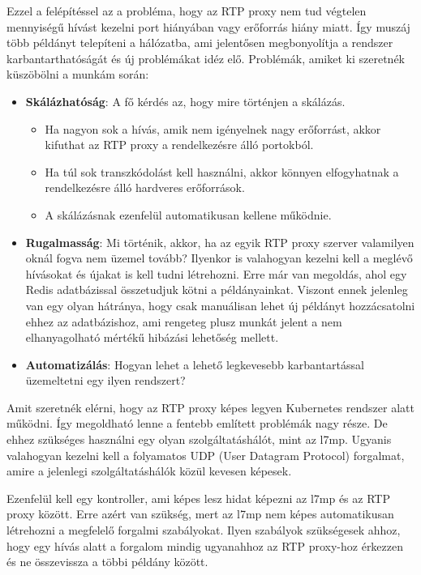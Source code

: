 Ezzel a felépítéssel az a probléma, hogy az RTP proxy nem tud végtelen mennyiségű
hívást kezelni port hiányában vagy erőforrás hiány miatt. Így muszáj több példányt
telepíteni a hálózatba, ami jelentősen megbonyolítja a rendszer 
karbantarthatóságát és új problémákat idéz elő. Problémák, amiket ki szeretnék 
küszöbölni a munkám során:

\begin{itemize}
	\item \textbf{Skálázhatóság}: A fő kérdés az, hogy mire történjen a skálázás. 
	\begin{itemize}
		\item Ha nagyon sok a hívás, amik nem igényelnek nagy erőforrást, akkor
		kifuthat az RTP proxy a rendelkezésre álló portokból.
		\item Ha túl sok transzkódolást kell használni, akkor könnyen elfogyhatnak
		a rendelkezésre álló hardveres erőforrások.
		\item A skálázásnak ezenfelül automatikusan kellene működnie. 
	\end{itemize}
	\item \textbf{Rugalmasság}: Mi történik, akkor, ha az egyik RTP proxy szerver
	valamilyen oknál fogva nem üzemel tovább? Ilyenkor is valahogyan kezelni 
	kell a meglévő hívásokat és újakat is kell tudni létrehozni. Erre már van 
	megoldás, ahol egy Redis adatbázissal összetudjuk kötni a példányainkat. 
	Viszont ennek jelenleg van egy olyan hátránya, hogy csak manuálisan lehet 
	új példányt hozzácsatolni ehhez az adatbázishoz, ami rengeteg plusz munkát 
	jelent a nem elhanyagolható mértékű hibázási lehetőség mellett.
	\item \textbf{Automatizálás}: Hogyan lehet a lehető legkevesebb 
	karbantartással üzemeltetni egy ilyen rendszert? 
\end{itemize}

Amit szeretnék elérni, hogy az RTP proxy képes legyen Kubernetes rendszer alatt 
működni. Így megoldható lenne a fentebb említett problémák nagy része. De 
ehhez szükséges használni egy olyan szolgáltatáshálót, mint az l7mp. Ugyanis 
valahogyan kezelni kell a folyamatos UDP (User Datagram Protocol) forgalmat, amire
a jelenlegi szolgáltatáshálók közül kevesen képesek.

Ezenfelül kell egy kontroller, ami képes lesz hidat képezni az l7mp és az RTP 
proxy között. Erre azért van szükség, mert az l7mp nem képes automatikusan 
létrehozni a megfelelő forgalmi szabályokat. Ilyen szabályok szükségesek ahhoz, 
hogy egy hívás alatt a forgalom mindig ugyanahhoz az RTP proxy-hoz érkezzen és 
ne összevissza a többi példány között.  

